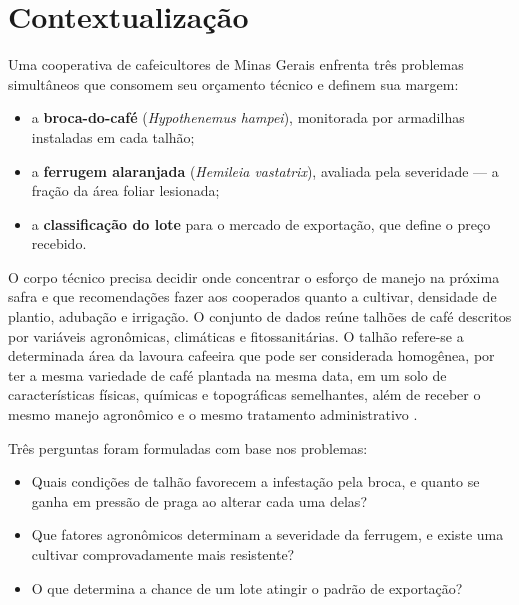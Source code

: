 %
%

\section{Contextualização}

Uma cooperativa de cafeicultores de Minas Gerais enfrenta três problemas simultâneos que
consomem seu orçamento técnico e definem sua margem:

\begin{itemize}
    \item a \textbf{broca-do-café} (\emph{Hypothenemus hampei}), monitorada por armadilhas instaladas em cada talhão;
    \item a \textbf{ferrugem alaranjada} (\emph{Hemileia vastatrix}), avaliada pela severidade — a fração da área foliar lesionada;
    \item a \textbf{classificação do lote} para o mercado de exportação, que define o preço recebido.
\end{itemize}

O corpo técnico precisa decidir onde concentrar o esforço de manejo na próxima safra e
que recomendações fazer aos cooperados quanto a cultivar, densidade de plantio,
adubação e irrigação. O conjunto de dados reúne \baseN{} talhões de café descritos por
\baseVars{} variáveis agronômicas, climáticas e fitossanitárias. O talhão refere-se a determinada 
área da lavoura cafeeira que pode ser considerada homogênea, por ter a mesma variedade de 
café plantada na mesma data, em um solo de características físicas, químicas e topográficas 
semelhantes, além de receber o mesmo manejo agronômico e o mesmo tratamento administrativo \cite{santos2009analise}.

Três perguntas foram formuladas com base nos problemas:
\begin{itemize}
  \item Quais condições de talhão favorecem a infestação pela broca, e quanto se ganha em pressão de praga ao alterar cada uma delas?
  \item Que fatores agronômicos determinam a severidade da ferrugem, e existe uma cultivar comprovadamente mais resistente?
  \item O que determina a chance de um lote atingir o padrão de exportação?
\end{itemize}

